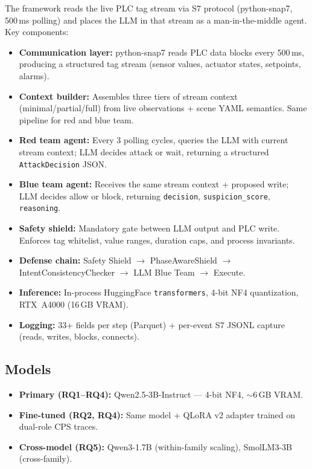 \documentclass[11pt]{article}
\begin{document}
The framework reads the live PLC tag stream via S7 protocol (python-snap7, 500\,ms polling) and places the LLM in that stream as a man-in-the-middle agent. Key components:
\begin{itemize}[leftmargin=1.5em]
    \item \textbf{Communication layer:} python-snap7 reads PLC data blocks every 500\,ms, producing a structured tag stream (sensor values, actuator states, setpoints, alarms).
    \item \textbf{Context builder:} Assembles three tiers of stream context (minimal/partial/full) from live observations + scene YAML semantics. Same pipeline for red and blue team.
    \item \textbf{Red team agent:} Every 3 polling cycles, queries the LLM with current stream context; LLM decides attack or wait, returning a structured \texttt{AttackDecision} JSON.
    \item \textbf{Blue team agent:} Receives the same stream context + proposed write; LLM decides allow or block, returning \texttt{decision}, \texttt{suspicion\_score}, \texttt{reasoning}.
    \item \textbf{Safety shield:} Mandatory gate between LLM output and PLC write. Enforces tag whitelist, value ranges, duration caps, and process invariants.
    \item \textbf{Defense chain:} Safety Shield $\to$ PhaseAwareShield $\to$ IntentConsistencyChecker $\to$ LLM Blue Team $\to$ Execute.
    \item \textbf{Inference:} In-process HuggingFace \texttt{transformers}, 4-bit NF4 quantization, RTX~A4000 (16\,GB VRAM).
    \item \textbf{Logging:} 33+ fields per step (Parquet) + per-event S7 JSONL capture (reads, writes, blocks, connects).
\end{itemize}

\subsection*{Models}

\begin{itemize}[leftmargin=1.5em,nosep]
    \item \textbf{Primary (RQ1--RQ4):} Qwen2.5-3B-Instruct --- 4-bit NF4, $\sim$6\,GB VRAM.
    \item \textbf{Fine-tuned (RQ2, RQ4):} Same model + QLoRA v2 adapter trained on dual-role CPS traces.
    \item \textbf{Cross-model (RQ5):} Qwen3-1.7B (within-family scaling), SmolLM3-3B (cross-family).
\end{itemize}
\end{document}
